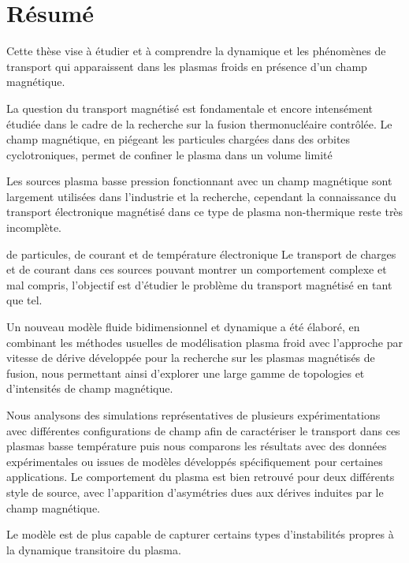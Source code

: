 \thispagestyle{empty}
\cleardoublepage
\thispagestyle{preface}	
	\section*{Résumé}
		Cette thèse vise à étudier et à comprendre la dynamique et les phénomènes de
		transport qui apparaissent dans les plasmas froids en présence d'un champ
		magnétique.
		
		La question du transport magnétisé est fondamentale et encore intensément
		étudiée dans le cadre de la recherche sur la fusion thermonucléaire
		contrôlée. Le champ magnétique, en piégeant les particules
		chargées dans des orbites cyclotroniques, permet de confiner le
		plasma dans un volume limité
		
		 Les sources plasma
		basse pression fonctionnant avec un champ magnétique sont largement utilisées dans l'industrie et la recherche,
		cependant la connaissance du transport électronique magnétisé dans ce type
		de plasma non-thermique reste très incomplète. 
		
		de particules, de courant et de température électronique
		Le transport de charges et de
		courant dans ces sources pouvant montrer un comportement complexe et mal compris,
		l'objectif est d'étudier le problème du transport magnétisé en
		tant que tel.
		
		Un nouveau modèle fluide bidimensionnel et dynamique a été élaboré, en
		combinant les méthodes usuelles de modélisation plasma froid avec l'approche
		par vitesse de dérive développée pour la recherche sur les plasmas magnétisés
		de fusion, nous permettant ainsi d'explorer une large gamme de topologies et
		d'intensités de champ magnétique.
		
		Nous analysons des simulations représentatives de plusieurs expérimentations
		avec différentes configurations de champ afin de caractériser le transport
		dans ces plasmas basse température puis nous comparons les résultats avec des
		données expérimentales ou issues de modèles développés spécifiquement pour
		certaines applications. Le comportement du plasma est bien retrouvé pour deux
		différents style de source, avec l’apparition d’asymétries dues aux dérives
		induites par le champ magnétique. 
		
		Le modèle est de plus capable de capturer
		certains types d'instabilités propres à la dynamique transitoire du plasma.		